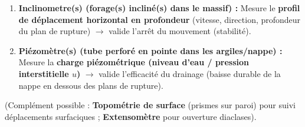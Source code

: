 \documentclass[11pt]{article}
\begin{document}
\begin{exercice}
\begin{enumerate}
\begin{enumerate}
      \item \textbf{Inclinometre(s) (forage(s) incliné(s) dans le massif) :} Mesure le \textbf{profil de déplacement horizontal en profondeur} (vitesse, direction, profondeur du plan de rupture) $\rightarrow$ valide l'arrêt du mouvement (stabilité).
      \item \textbf{Piézomètre(s) (tube perforé en pointe dans les argiles/nappe) :} Mesure la \textbf{charge piézométrique (niveau d'eau / pression interstitielle $u$)} $\rightarrow$ valide l'efficacité du drainage (baisse durable de la nappe en dessous des plans de rupture).
      \end{enumerate}
      (Complément possible : \textbf{Topométrie de surface} (prismes sur paroi) pour suivi déplacements surfaciques ; \textbf{Extensomètre} pour ouverture diaclases).
\end{enumerate}
\end{exercice}
\end{document}
